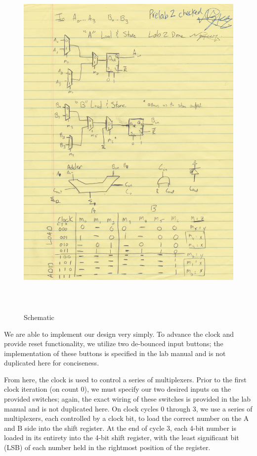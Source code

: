 \documentclass[paper=letter, fontsize=11pt]{scrartcl}
\begin{document}
\begin{figure}[H]
\includegraphics[height=180mm]{prelab2.jpg}
\centering
\caption{Schematic}
\label{overflow}
\end{figure}

We are able to implement our design very simply. To advance the clock and provide reset functionality, we utilize two de-bounced input buttons; the implementation of these buttons is specified in the lab manual and is not duplicated here for conciseness.

From here, the clock is used to control a series of multiplexers. Prior to the first clock iteration (on count 0), we must specify our two desired inputs on the provided switches; again, the exact wiring of these switches is provided in the lab manual and is not duplicated here. On clock cycles 0 through 3, we use a series of multiplexers, each controlled by a clock bit, to load the correct number on the A and B side into the shift register. At the end of cycle 3, each 4-bit number is loaded in its entirety into the 4-bit shift register, with the least significant bit (LSB) of each number held in the rightmost position of the register.
\end{document}
